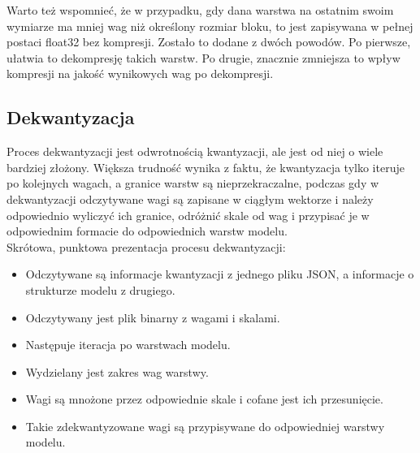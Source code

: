 Warto też wspomnieć, że w przypadku, gdy dana warstwa na ostatnim swoim wymiarze ma mniej wag niż określony rozmiar bloku, to jest zapisywana w pełnej postaci float32 bez kompresji. Zostało to dodane z dwóch powodów. Po pierwsze, ułatwia to dekompresję takich warstw. Po drugie, znacznie zmniejsza to wpływ kompresji na jakość wynikowych wag po dekompresji.

\subsection{Dekwantyzacja}
Proces dekwantyzacji jest odwrotnością kwantyzacji, ale jest od niej o wiele bardziej złożony. Większa trudność wynika z faktu, że kwantyzacja tylko iteruje po kolejnych wagach, a granice warstw są nieprzekraczalne, podczas gdy w dekwantyzacji odczytywane wagi są zapisane w ciągłym wektorze i należy odpowiednio wyliczyć ich granice, odróżnić skale od wag i przypisać je w odpowiednim formacie do odpowiednich warstw modelu. \\
Skrótowa, punktowa prezentacja procesu dekwantyzacji:
\begin{itemize}
    \item Odczytywane są informacje kwantyzacji z jednego pliku JSON, a informacje o strukturze modelu z drugiego.
    \item Odczytywany jest plik binarny z wagami i skalami.
    \item Następuje iteracja po warstwach modelu.
    \item Wydzielany jest zakres wag warstwy.
    \item Wagi są mnożone przez odpowiednie skale i cofane jest ich przesunięcie.
    \item Takie zdekwantyzowane wagi są przypisywane do odpowiedniej warstwy modelu.
\end{itemize}

